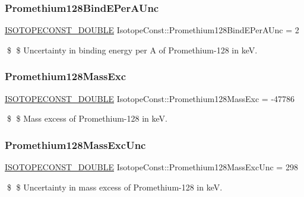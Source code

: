 \subsubsection{\texorpdfstring{Promethium128\+Bind\+E\+Per\+A\+Unc}{Promethium128BindEPerAUnc}}
{\footnotesize\ttfamily \mbox{\hyperlink{group___isotope_const-_macros_ga8f45a7272ce02c0b4c65c44636ed719a}{I\+S\+O\+T\+O\+P\+E\+C\+O\+N\+S\+T\+\_\+\+D\+O\+U\+B\+LE}} Isotope\+Const\+::\+Promethium128\+Bind\+E\+Per\+A\+Unc = 2}

\$ \$ Uncertainty in binding energy per A of Promethium-\/128 in keV. \mbox{\label{group___isotope_const-_promethium-_pm128_ga453f980a74d9aab7dc483d482a131372}} 
\subsubsection{\texorpdfstring{Promethium128\+Mass\+Exc}{Promethium128MassExc}}
{\footnotesize\ttfamily \mbox{\hyperlink{group___isotope_const-_macros_ga8f45a7272ce02c0b4c65c44636ed719a}{I\+S\+O\+T\+O\+P\+E\+C\+O\+N\+S\+T\+\_\+\+D\+O\+U\+B\+LE}} Isotope\+Const\+::\+Promethium128\+Mass\+Exc = -\/47786}

\$ \$ Mass excess of Promethium-\/128 in keV. \mbox{\label{group___isotope_const-_promethium-_pm128_gaf9e8533ad8899aa0ea06b29b62c3ebf6}} 
\subsubsection{\texorpdfstring{Promethium128\+Mass\+Exc\+Unc}{Promethium128MassExcUnc}}
{\footnotesize\ttfamily \mbox{\hyperlink{group___isotope_const-_macros_ga8f45a7272ce02c0b4c65c44636ed719a}{I\+S\+O\+T\+O\+P\+E\+C\+O\+N\+S\+T\+\_\+\+D\+O\+U\+B\+LE}} Isotope\+Const\+::\+Promethium128\+Mass\+Exc\+Unc = 298}

\$ \$ Uncertainty in mass excess of Promethium-\/128 in keV. \mbox{\label{group___isotope_const-_promethium-_pm128_ga222323d0c1266d82069f1f92bb0c78e3}} 
